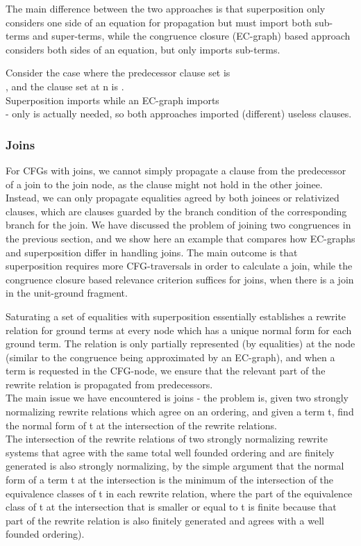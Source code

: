 The main difference between the two approaches is that superposition only considers one side of an equation for propagation but must import both sub-terms and super-terms, while the congruence closure (EC-graph) based approach considers both sides of an equation, but only imports sub-terms.

Consider the case where the predecessor clause set is \\
,
and the clause set at n is .\\
Superposition imports  while an EC-graph imports \\
 - only  is actually needed, so both approaches imported (different) useless clauses.

\subsubsection*{Joins}
For CFGs with joins, we cannot simply propagate a clause from the predecessor of a join to the join node, as the clause might not hold in the other joinee. Instead, we can only propagate equalities agreed by both joinees or relativized clauses, which are clauses guarded by the branch condition of the corresponding branch for the join. We have discussed the problem of joining two congruences in the previous section, and we show here an example that compares how EC-graphs and superposition differ in handling joins. The main outcome is that superposition requires more CFG-traversals in order to calculate a join, while the congruence closure based relevance criterion suffices for joins, when there is a join in the unit-ground fragment.

Saturating a set of equalities with superposition essentially establishes a rewrite relation for ground terms at every node which has a unique normal form for each ground term. The relation is only partially represented (by equalities) at the node (similar to the congruence being approximated by an EC-graph), and when a term is requested in the CFG-node, we ensure that the relevant part of the rewrite relation is propagated from predecessors.\\
The main issue we have encountered is joins - the problem is, given two strongly normalizing rewrite relations which agree on an ordering, and given a term t, find the normal form of t at the intersection of the rewrite relations. \\
The intersection of the rewrite relations of two strongly normalizing rewrite systems that agree with the same total well founded ordering and are finitely generated is also strongly normalizing, by the simple argument that the normal form of a term t at the intersection is the minimum of the intersection of the equivalence classes of t in each rewrite relation, where the part of the equivalence class of t at the intersection that is smaller or equal to t is finite because that part of the rewrite relation is also finitely generated and agrees with a well founded ordering).

